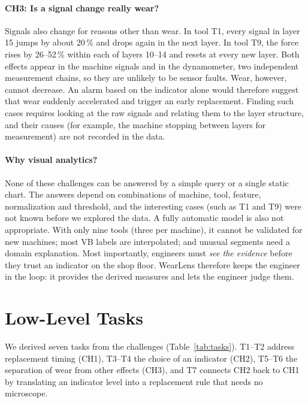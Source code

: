 \paragraph{CH3: Is a signal change really wear?}
Signals also change for reasons other than wear. In tool T1, every signal in layer 15 jumps by about
20\,\% and drops again in the next layer. In tool T9, the force rises by 26--52\,\% within each of layers
10--14 and resets at every new layer. Both effects appear in the machine signals and in the dynamometer,
two independent measurement chains, so they are unlikely to be sensor faults. Wear, however, cannot
decrease. An alarm based on the indicator alone would therefore suggest that wear suddenly accelerated
and trigger an early replacement. Finding such cases requires looking at the raw signals and relating them
to the layer structure, and their causes (for example, the machine stopping between layers for
measurement) are not recorded in the data.

\paragraph{Why visual analytics?}
None of these challenges can be answered by a simple query or a single static chart.
The answers depend on combinations of machine, tool, feature, normalization and threshold, and the
interesting cases (such as T1 and T9) were not known before we explored the data.
A fully automatic model is also not appropriate. With only nine tools (three per machine), it cannot be
validated for new machines; most VB labels are interpolated; and unusual segments need a domain
explanation. Most importantly, engineers must \emph{see the evidence} before they trust an indicator on the
shop floor. WearLens therefore keeps the engineer in the loop: it provides the derived measures and lets
the engineer judge them.

\section{Low-Level Tasks}
We derived seven tasks from the challenges (Table~\ref{tab:tasks}).
T1--T2 address replacement timing (CH1),
T3--T4 the choice of an indicator (CH2),
T5--T6 the separation of wear from other effects (CH3), and
T7 connects CH2 back to CH1 by translating an indicator level into a replacement rule
that needs no microscope.

